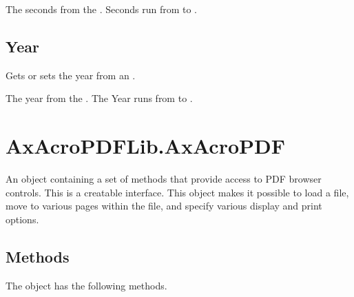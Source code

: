 \documentclass[letterpaper,12pt,english,openany,oneside]{sphinxmanual}
\begin{document}

\begin{sphinxVerbatim}[commandchars=\\\{\}]
\PYG{p}{[}\PYG{p}{]} 
\end{sphinxVerbatim}


The seconds from the . Seconds run from  to .




\subsection{Year}
\label{\detokenize{IAC_API_OLE_Objects:year}}
Gets or sets the year from an .


\begin{sphinxVerbatim}[commandchars=\\\{\}]
\PYG{p}{[}\PYG{p}{]} 
\end{sphinxVerbatim}


The year from the . The Year runs from  to .




\section{AxAcroPDFLib.AxAcroPDF}
\label{\detokenize{IAC_API_OLE_Objects:axacropdflib-axacropdf}}
An object containing a set of methods that provide access to PDF browser controls. This is a creatable interface. This object makes it possible to load a file, move to various pages within the file, and specify various display and print options.


\subsection{Methods}
\label{\detokenize{IAC_API_OLE_Objects:methods-8}}\label{\detokenize{IAC_API_OLE_Objects:id24}}
The  object has the following methods.
\end{document}
